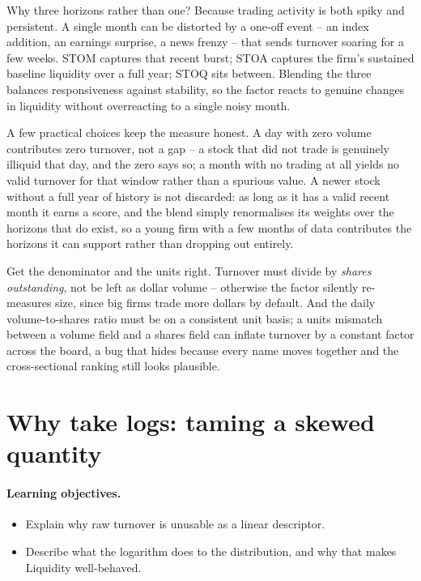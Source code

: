 \documentclass[11pt]{article}
\theoremstyle{definition}
\theoremstyle{plain}
\theoremstyle{remark}
\begin{document}
Why three horizons rather than one? Because trading activity is both spiky and persistent. A single month can be distorted by a one-off event -- an index addition, an earnings surprise, a news frenzy -- that sends turnover soaring for a few weeks. STOM captures that recent burst; STOA captures the firm's sustained baseline liquidity over a full year; STOQ sits between. Blending the three balances responsiveness against stability, so the factor reacts to genuine changes in liquidity without overreacting to a single noisy month.

A few practical choices keep the measure honest. A day with zero volume contributes zero turnover, not a gap -- a stock that did not trade is genuinely illiquid that day, and the zero says so; a month with no trading at all yields no valid turnover for that window rather than a spurious value. A newer stock without a full year of history is not discarded: as long as it has a valid recent month it earns a score, and the blend simply renormalises its weights over the horizons that do exist, so a young firm with a few months of data contributes the horizons it can support rather than dropping out entirely.

\begin{pitfall}
Get the denominator and the units right. Turnover must divide by \emph{shares outstanding}, not be left as dollar volume -- otherwise the factor silently re-measures size, since big firms trade more dollars by default. And the daily volume-to-shares ratio must be on a consistent unit basis; a units mismatch between a volume field and a shares field can inflate turnover by a constant factor across the board, a bug that hides because every name moves together and the cross-sectional ranking still looks plausible.
\end{pitfall}

\section{Why take logs: taming a skewed quantity}\label{sec:log}

\paragraph{Learning objectives.}
\begin{itemize}[leftmargin=1.4em,topsep=2pt]
  \item Explain why raw turnover is unusable as a linear descriptor.
  \item Describe what the logarithm does to the distribution, and why that makes Liquidity well-behaved.
\end{itemize}
\end{document}

